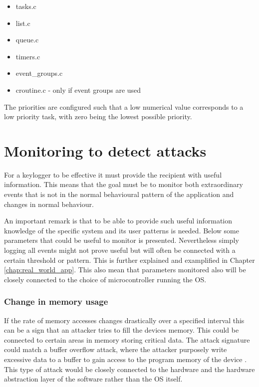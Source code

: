 \begin{itemize}
    \item tasks.c
    \item list.c
    \item queue.c
    \item timers.c
    \item event\_groups.c
    \item croutine.c - only if event groups are used
\end{itemize}
 
The priorities are configured such that a low numerical value corresponds to a low priority task, with zero being the lowest possible priority.

\section{Monitoring to detect attacks} \label{chap:freertos_monitor}

For a keylogger to be effective it must provide the recipient with useful information. This means that the goal must be to monitor both extraordinary events that is not in the normal behavioural pattern of the application and changes in normal behaviour. 

An important remark is that to be able to provide such useful information knowledge of the specific system and its user patterns is needed. Below some parameters that could be useful to monitor is presented. Nevertheless simply logging all events might not prove useful but will often be connected with a certain threshold or pattern. This is further explained and examplified in Chapter \ref{chap:real_world_app}. This also mean that parameters monitored also will be closely connected to the choice of microcontroller running the OS. 


\subsubsection{Change in memory usage}
If the rate of memory accesses changes drastically over a specified interval this can be a sign that an attacker tries to fill the devices memory. This could be connected to certain areas in memory storing critical data. The attack signature could match a buffer overflow attack, where the attacker purposely write excessive data to a buffer to gain access to the program memory of the device \cite{buffer_overflow}. This type of attack would be closely connected to the hardware and the hardware abstraction layer of the software rather than the OS itself. 

